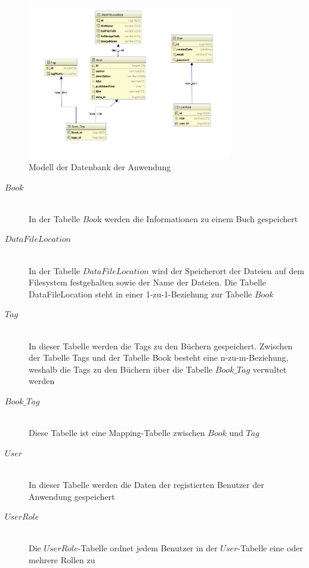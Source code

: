 \documentclass[12pt,a4paper]{book}
\begin{document}
		\begin{figure}[ht]
			\centering
			\includegraphics[width=0.8\textwidth]{Images/database.png}
			\caption[Datenbankdiagram]{Modell der Datenbank der Anwendung}
			\label{database}
		\end{figure}
		
		\begin{description}
			\item[\underline{$Book$}] \hfill \\
				In der Tabelle $Boo$k  werden die Informationen zu einem Buch gespeichert
			\item[\underline{$DataFileLocation$}] \hfill \\
			In der Tabelle $DataFileLocation$  wird der Speicherort der Dateien auf dem Filesystem festgehalten sowie der Name der Dateien. Die Tabelle DataFileLocation steht in einer 1-zu-1-Beziehung zur Tabelle $Book$
			\item[\underline{$Tag$}]\hfill \\
				In dieser Tabelle werden die Tags zu den Büchern gespeichert. Zwischen der Tabelle Tags und der Tabelle Book besteht eine n-zu-m-Beziehung, weshalb die Tags zu den Büchern über die Tabelle $Book\_Tag$ verwaltet werden
				\item[\underline{$Book\_Tag$}]\hfill \\
				Diese Tabelle ist eine Mapping-Tabelle zwischen $Book$ und $Tag$
				\item[\underline{$User$}]\hfill \\
				In dieser Tabelle werden die Daten der registierten Benutzer der Anwendung gespeichert
				\item[\underline{$UserRole$}]\hfill \\
				Die $UserRole$-Tabelle ordnet jedem Benutzer in der $User$-Tabelle eine oder mehrere Rollen zu
		\end{description}
\end{document}
